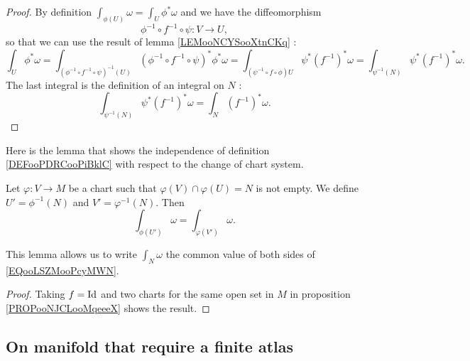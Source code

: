 \begin{proof}
    By definition \( \int_{\phi(U)}\omega=\int_U\phi^*\omega\) and we have the diffeomorphism 
    \begin{equation}
        \phi^{-1}\circ f^{-1}\circ \psi\colon V\to U,
    \end{equation}
    so that we can use the result of lemma \ref{LEMooNCYSooXtnCKq} :
    \begin{equation}
        \int_U\phi^*\omega=\int_{(\phi^{-1}\circ f^{-1}\circ \psi)^{-1}(U)}  (\phi^{-1}\circ f^{-1}\circ \psi)^*\phi^*\omega=\int_{(\psi^{-1}\circ f\circ \phi )U}\psi^*(f^{-1})^*\omega=\int_{\psi^{-1}(N)}\psi^*(f^{-1})^*\omega.
    \end{equation}
    The last integral is the definition of an integral on \( N\) :
    \begin{equation}
        \int_{\psi^{-1}(N)}\psi^*(f^{-1})^*\omega=\int_N(f^{-1})^*\omega.
    \end{equation}
\end{proof}

Here is the lemma that shows the independence of definition \ref{DEFooPDRCooPiBklC} with respect to the change of chart system.
\begin{lemma}       
    Let \( \varphi\colon V\to M\) be a chart such that \( \varphi(V)\cap \varphi(U)=N\) is not empty. We define \( U'=\phi^{-1}(N)\) and \( V'=\varphi^{-1}(N)\). Then
    \begin{equation}        \label{EQooLSZMooPcyMWN}
        \int_{\phi(U')}\omega=\int_{\varphi(V')}\omega.
    \end{equation}
\end{lemma}
This lemma allows us to write \( \int_N\omega\) the common value of both sides of \eqref{EQooLSZMooPcyMWN}.

\begin{proof}
    Taking \( f=\operatorname{Id}\) and two charts for the same open set in \( M\) in proposition \ref{PROPooNJCLooMqeeeX} shows the result.
\end{proof}
 
\subsection{On manifold that require a finite atlas}

